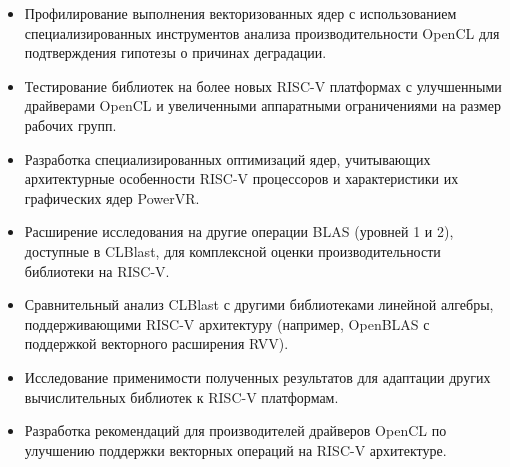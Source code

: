 \begin{itemize}
    \item Профилирование выполнения векторизованных ядер с использованием специализированных инструментов анализа производительности OpenCL для подтверждения гипотезы о причинах деградации.
    
    \item Тестирование библиотек на более новых RISC-V платформах с улучшенными драйверами OpenCL и увеличенными аппаратными ограничениями на размер рабочих групп.
    
    \item Разработка специализированных оптимизаций ядер, учитывающих архитектурные особенности RISC-V процессоров и характеристики их графических ядер PowerVR.
    
    \item Расширение исследования на другие операции BLAS (уровней 1 и 2), доступные в CLBlast, для комплексной оценки производительности библиотеки на RISC-V.
    
    \item Сравнительный анализ CLBlast с другими библиотеками линейной алгебры, поддерживающими RISC-V архитектуру (например, OpenBLAS с поддержкой векторного расширения RVV).
    
    \item Исследование применимости полученных результатов для адаптации других вычислительных библиотек к RISC-V платформам.
    
    \item Разработка рекомендаций для производителей драйверов OpenCL по улучшению поддержки векторных операций на RISC-V архитектуре.
\end{itemize}